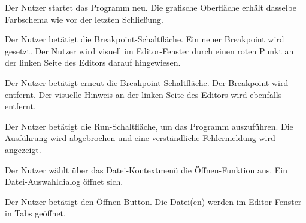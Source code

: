\documentclass[parskip=full,11pt,twoside]{scrartcl}
\begin{document}
{Der Nutzer startet das Programm neu.}
{Die grafische Oberfläche erhält dasselbe Farbschema wie vor der letzten Schließung.}



{Der Nutzer betätigt die Breakpoint-Schaltfläche.}
{Ein neuer Breakpoint wird gesetzt. Der Nutzer wird visuell im Editor-Fenster durch einen roten Punkt an der linken Seite des Editors darauf hingewiesen.}

{Der Nutzer betätigt erneut die Breakpoint-Schaltfläche.}
{Der Breakpoint wird entfernt. Der visuelle Hinweis an der linken Seite des Editors wird ebenfalls entfernt.}



{Der Nutzer betätigt die Run-Schaltfläche, um das Programm auszuführen.}
{Die Ausführung wird abgebrochen und eine verständliche Fehlermeldung wird angezeigt.}




{Der Nutzer wählt über das Datei-Kontextmenü die Öffnen-Funktion aus.}
{Ein Datei-Auswahldialog öffnet sich.}

{Der Nutzer betätigt den Öffnen-Button.}
{Die Datei(en) werden im Editor-Fenster in Tabs geöffnet.}


\end{document}
